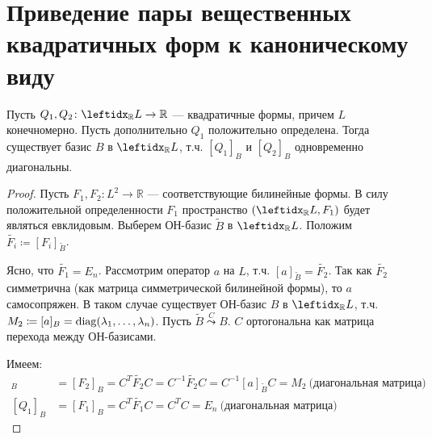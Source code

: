 \section{Приведение пары вещественных квадратичных форм к каноническому виду}

\begin{thm*}
    Пусть $Q_1, Q_2 \colon \lsub{\mathbb{R}}{L} \to \mathbb{R}$ --- квадратичные формы, причем $L$ конечномерно. Пусть дополнительно $Q_1$ положительно определена. Тогда существует базис $B$ в $\lsub{\mathbb{R}}{L}$, т.ч. $[Q_1]_B$ и $[Q_2]_B$ одновременно диагональны.
\end{thm*}

\begin{proof}
    Пусть $F_1, F_2 \colon L^2 \to \mathbb{R}$ --- соответствующие билинейные формы. В силу положительной определенности $F_1$ пространство $(\lsub{\mathbb{R}}{L}, F_1)$ будет являться евклидовым. Выберем ОН-базис $\tilde{B}$ в $\lsub{\mathbb{R}}{L}$. Положим $\tilde{F_i} \coloneqq [F_i]_{\tilde{B}}$.
    
    Ясно, что $\tilde{F_1} = E_n$. Рассмотрим оператор $a$ на $L$, т.ч. $[a]_{\tilde{B}} = \tilde{F_2}$. Так как $\tilde{F_2}$ симметрична (как матрица симметрической билинейной формы), то $a$ самосопряжен. В таком случае существует ОН-базис $B$ в $\lsub{\mathbb{R}}{L}$, т.ч. $M_2 \coloneqq [a]_B = \operatorname{diag}(\lambda_1, \dots, \lambda_n)$. Пусть $\tilde{B} \stackrel{C}{\leadsto} B$. $C$ ортогональна как матрица перехода между ОН-базисами.
    
    Имеем:
    \begin{align*}
        [Q_2]_B &= [F_2]_B = C^T \tilde{F_2} C = C^{-1} \tilde{F_2} C = C^{-1} [a]_{\tilde{B}} C = M_2\ \text{(диагональная матрица)} \\
        [Q_1]_B &= [F_1]_B = C^T \tilde{F_1} C = C^T C = E_n\ \text{(диагональная матрица)}
    \end{align*}
\end{proof}